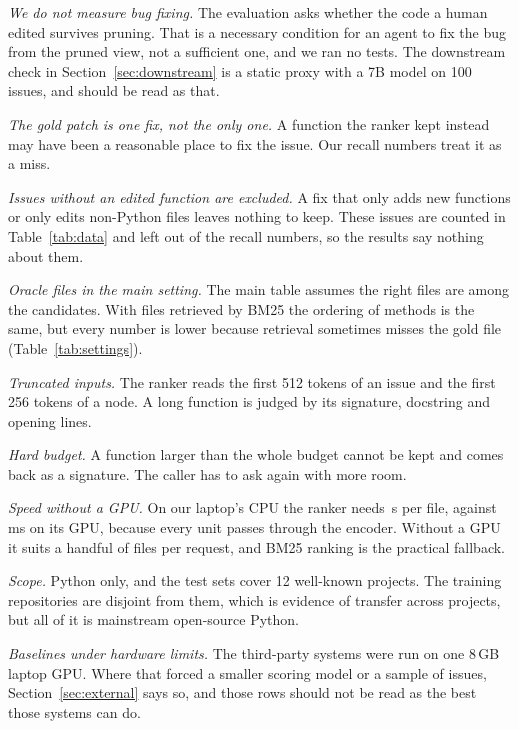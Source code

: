 \emph{We do not measure bug fixing.} The evaluation asks whether the code a human edited survives pruning. That is a necessary condition for an agent to fix the bug from the pruned view, not a sufficient one, and we ran no tests. The downstream check in Section~\ref{sec:downstream} is a static proxy with a 7B model on 100 issues, and should be read as that.

\emph{The gold patch is one fix, not the only one.} A function the ranker kept instead may have been a reasonable place to fix the issue. Our recall numbers treat it as a miss.

\emph{Issues without an edited function are excluded.} A fix that only adds new functions or only edits non-Python files leaves nothing to keep. These issues are counted in Table~\ref{tab:data} and left out of the recall numbers, so the results say nothing about them.

\emph{Oracle files in the main setting.} The main table assumes the right files are among the candidates. With files retrieved by BM25 the ordering of methods is the same, but every number is lower because retrieval sometimes misses the gold file (Table~\ref{tab:settings}).

\emph{Truncated inputs.} The ranker reads the first 512 tokens of an issue and the first 256 tokens of a node. A long function is judged by its signature, docstring and opening lines.

\emph{Hard budget.} A function larger than the whole budget cannot be kept and comes back as a signature. The caller has to ask again with more room.

\emph{Speed without a GPU.} On our laptop's CPU the ranker needs \,s per file, against \,ms on its GPU, because every unit passes through the encoder. Without a GPU it suits a handful of files per request, and BM25 ranking is the practical fallback.

\emph{Scope.} Python only, and the test sets cover 12 well-known projects. The training repositories are disjoint from them, which is evidence of transfer across projects, but all of it is mainstream open-source Python.

\emph{Baselines under hardware limits.} The third-party systems were run on one 8\,GB laptop GPU. Where that forced a smaller scoring model or a sample of issues, Section~\ref{sec:external} says so, and those rows should not be read as the best those systems can do.

